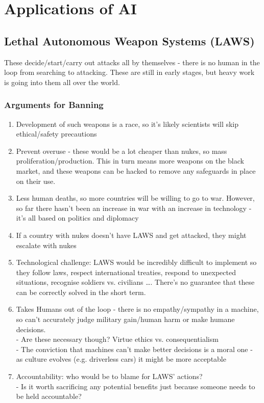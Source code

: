 \section{Applications of AI}

\subsection{Lethal Autonomous Weapon Systems (LAWS)}
These decide/start/carry out attacks all by themselves - there is no human in the loop from searching to attacking. These are still in early stages, but heavy work is going into them all over the world.

\subsubsection{Arguments for Banning}
\begin{enumerate}
    \item Development of such weapons is a race, so it's likely scientists will skip ethical/safety precautions
    \item Prevent overuse - these would be a lot cheaper than nukes, so mass proliferation/production. This in turn means more weapons on the black market, and these weapons can be hacked to remove any safeguards in place on their use.
    \item Less human deaths, so more countries will be willing to go to war. However, so far there hasn't been an increase in war with an increase in technology - it's all based on politics and diplomacy
    \item If a country with nukes doesn't have LAWS and get attacked, they might escalate with nukes
    \item Technological challenge: LAWS would be incredibly difficult to implement so they follow laws, respect international treaties, respond to unexpected situations, recognise soldiers vs. civilians \dots . There's no guarantee that these can be correctly solved in the short term.
    \item Takes Humans out of the loop - there is no empathy/sympathy in a machine, so can't accurately judge military gain/human harm or make humane decisions.\\
    \qquad - Are these necessary though? Virtue ethics vs. consequentialism\\
    \qquad - The conviction that machines can't make better decisions is a moral one - as culture evolves (e.g. driverless cars) it might be more acceptable
    \item Accountability: who would be to blame for LAWS' actions?\\
    \qquad - Is it worth sacrificing any potential benefits just because someone needs to be held accountable?
\end{enumerate}

